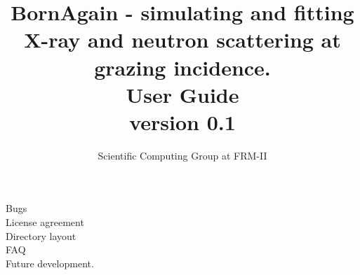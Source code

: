 \documentclass[article,10pt]{report}
\title{
BornAgain - simulating and fitting X-ray and neutron scattering at grazing incidence. \\
\vspace*{10mm} User Guide \\
\large{ version 0.1}
}
\author{Scientific Computing Group at FRM-II}
\newcommand\BackgroundPic{%
\put(0,0){%
\parbox[b][\paperheight]{\paperwidth}{%
\vfill
\centering
\texttt{[image: results2\_2.png]}%
\vfill
}}}
\begin{document}
\maketitle



\tableofcontents






%

%


Bugs\\ License agreement\\ Directory layout \\ FAQ \\ Future development.
%





\end{document}
